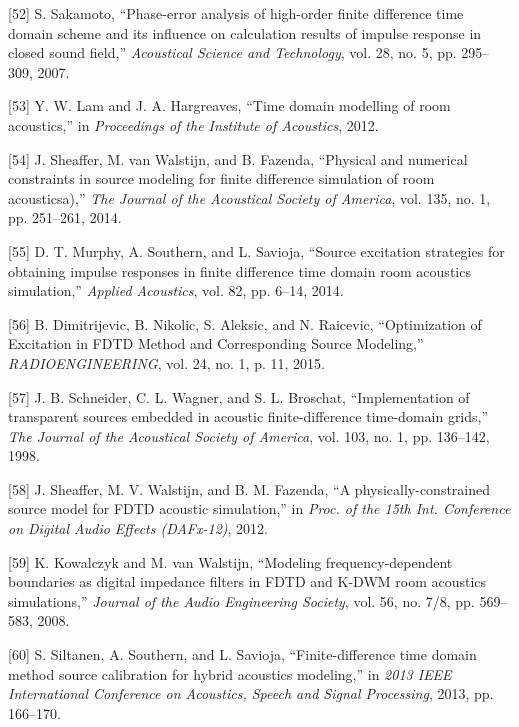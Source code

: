 \documentclass[]{scrreprt}
\begin{document}
\hypertarget{ref-sakamotoux5fphase-errorux5f2007}{}
{[}52{]} S. Sakamoto, ``Phase-error analysis of high-order finite
difference time domain scheme and its influence on calculation results
of impulse response in closed sound field,'' \emph{Acoustical Science
and Technology}, vol. 28, no. 5, pp. 295--309, 2007.

\hypertarget{ref-lamux5ftimeux5f2012}{}
{[}53{]} Y. W. Lam and J. A. Hargreaves, ``Time domain modelling of room
acoustics,'' in \emph{Proceedings of the Institute of Acoustics}, 2012.

\hypertarget{ref-sheafferux5fphysicalux5f2014}{}
{[}54{]} J. Sheaffer, M. van Walstijn, and B. Fazenda, ``Physical and
numerical constraints in source modeling for finite difference
simulation of room acousticsa),'' \emph{The Journal of the Acoustical
Society of America}, vol. 135, no. 1, pp. 251--261, 2014.

\hypertarget{ref-murphyux5fsourceux5f2014}{}
{[}55{]} D. T. Murphy, A. Southern, and L. Savioja, ``Source excitation
strategies for obtaining impulse responses in finite difference time
domain room acoustics simulation,'' \emph{Applied Acoustics}, vol. 82,
pp. 6--14, 2014.

\hypertarget{ref-dimitrijevicux5foptimizationux5f2015}{}
{[}56{]} B. Dimitrijevic, B. Nikolic, S. Aleksic, and N. Raicevic,
``Optimization of Excitation in FDTD Method and Corresponding Source
Modeling,'' \emph{RADIOENGINEERING}, vol. 24, no. 1, p. 11, 2015.

\hypertarget{ref-schneiderux5fimplementationux5f1998}{}
{[}57{]} J. B. Schneider, C. L. Wagner, and S. L. Broschat,
``Implementation of transparent sources embedded in acoustic
finite-difference time-domain grids,'' \emph{The Journal of the
Acoustical Society of America}, vol. 103, no. 1, pp. 136--142, 1998.

\hypertarget{ref-sheafferux5fphysically-constrainedux5f2012}{}
{[}58{]} J. Sheaffer, M. V. Walstijn, and B. M. Fazenda, ``A
physically-constrained source model for FDTD acoustic simulation,'' in
\emph{Proc. of the 15th Int. Conference on Digital Audio Effects
(DAFx-12)}, 2012.

\hypertarget{ref-kowalczykux5fmodelingux5f2008}{}
{[}59{]} K. Kowalczyk and M. van Walstijn, ``Modeling
frequency-dependent boundaries as digital impedance filters in FDTD and
K-DWM room acoustics simulations,'' \emph{Journal of the Audio
Engineering Society}, vol. 56, no. 7/8, pp. 569--583, 2008.

\hypertarget{ref-siltanenux5ffinite-differenceux5f2013}{}
{[}60{]} S. Siltanen, A. Southern, and L. Savioja, ``Finite-difference
time domain method source calibration for hybrid acoustics modeling,''
in \emph{2013 IEEE International Conference on Acoustics, Speech and
Signal Processing}, 2013, pp. 166--170.
\end{document}
